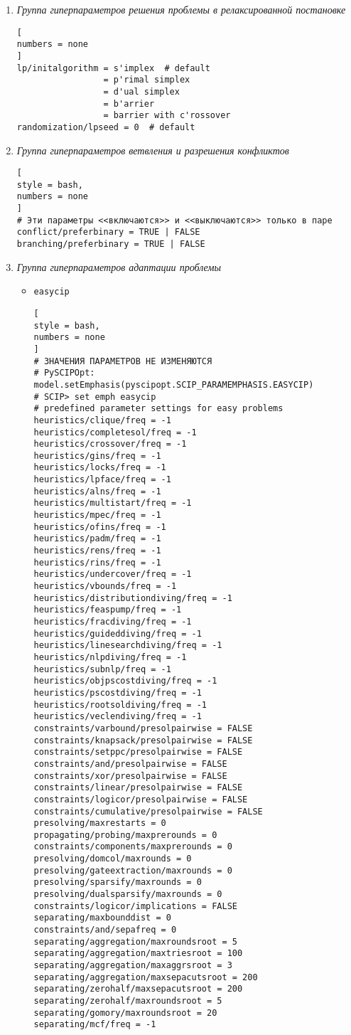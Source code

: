 \documentclass[%
	11pt,
	a4paper,
	utf8,
		]{article}
\begin{document}
\begin{enumerate}
    \item \emph{Группа гиперпараметров решения проблемы в релаксированной постановке}
\begin{lstlisting}[
numbers = none
]
lp/initalgorithm = s'implex  # default
                 = p'rimal simplex
                 = d'ual simplex
                 = b'arrier
                 = barrier with c'rossover
randomization/lpseed = 0  # default
\end{lstlisting}

    \item \emph{Группа гиперпараметров ветвления и разрешения конфликтов}
\begin{lstlisting}[
style = bash,
numbers = none
]
# Эти параметры <<включаются>> и <<выключаются>> только в паре
conflict/preferbinary = TRUE | FALSE
branching/preferbinary = TRUE | FALSE
\end{lstlisting}

    \item \emph{Группа гиперпараметров адаптации проблемы}
    \begin{itemize}
    	\item \verb|easycip|
\begin{lstlisting}[
style = bash,
numbers = none
]
# ЗНАЧЕНИЯ ПАРАМЕТРОВ НЕ ИЗМЕНЯЮТСЯ
# PySCIPOpt: model.setEmphasis(pyscipopt.SCIP_PARAMEMPHASIS.EASYCIP)
# SCIP> set emph easycip
# predefined parameter settings for easy problems
heuristics/clique/freq = -1
heuristics/completesol/freq = -1
heuristics/crossover/freq = -1
heuristics/gins/freq = -1
heuristics/locks/freq = -1
heuristics/lpface/freq = -1
heuristics/alns/freq = -1
heuristics/multistart/freq = -1
heuristics/mpec/freq = -1
heuristics/ofins/freq = -1
heuristics/padm/freq = -1
heuristics/rens/freq = -1
heuristics/rins/freq = -1
heuristics/undercover/freq = -1
heuristics/vbounds/freq = -1
heuristics/distributiondiving/freq = -1
heuristics/feaspump/freq = -1
heuristics/fracdiving/freq = -1
heuristics/guideddiving/freq = -1
heuristics/linesearchdiving/freq = -1
heuristics/nlpdiving/freq = -1
heuristics/subnlp/freq = -1
heuristics/objpscostdiving/freq = -1
heuristics/pscostdiving/freq = -1
heuristics/rootsoldiving/freq = -1
heuristics/veclendiving/freq = -1
constraints/varbound/presolpairwise = FALSE
constraints/knapsack/presolpairwise = FALSE
constraints/setppc/presolpairwise = FALSE
constraints/and/presolpairwise = FALSE
constraints/xor/presolpairwise = FALSE
constraints/linear/presolpairwise = FALSE
constraints/logicor/presolpairwise = FALSE
constraints/cumulative/presolpairwise = FALSE
presolving/maxrestarts = 0
propagating/probing/maxprerounds = 0
constraints/components/maxprerounds = 0
presolving/domcol/maxrounds = 0
presolving/gateextraction/maxrounds = 0
presolving/sparsify/maxrounds = 0
presolving/dualsparsify/maxrounds = 0
constraints/logicor/implications = FALSE
separating/maxbounddist = 0
constraints/and/sepafreq = 0
separating/aggregation/maxroundsroot = 5
separating/aggregation/maxtriesroot = 100
separating/aggregation/maxaggrsroot = 3
separating/aggregation/maxsepacutsroot = 200
separating/zerohalf/maxsepacutsroot = 200
separating/zerohalf/maxroundsroot = 5
separating/gomory/maxroundsroot = 20
separating/mcf/freq = -1
\end{lstlisting}


\end{itemize}
\end{enumerate}
\end{document}
